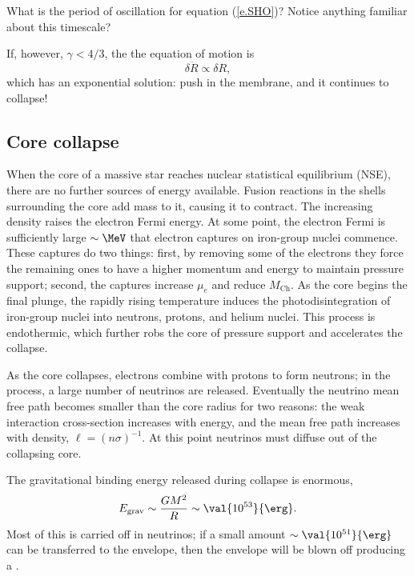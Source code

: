 \begin{exercisebox}
What is the period of oscillation for equation (\ref{e.SHO})?  Notice anything familiar about this timescale?
\end{exercisebox}

\noindent If, however, $\gamma < 4/3$, the the equation of motion is
\[ \delta\ddot{R} \propto \delta R, \]
which has an exponential solution: push in the membrane, and it continues to collapse!

\subsection{Core collapse}
When the core of a massive star reaches nuclear statistical equilibrium (NSE), there are no further sources of energy available. Fusion reactions in the shells surrounding the core add mass to it, causing it to contract.  The increasing density raises the electron Fermi energy.  At some point, the electron Fermi is sufficiently large $\sim\MeV$ that electron captures on iron-group nuclei commence.  These captures do two things: first, by removing some of the electrons they force the remaining ones to have a higher momentum and energy to maintain pressure support; second, the captures increase $\mu_{e}$ and reduce $M_{\mathrm{Ch}}$.  As the core begins the final plunge, the rapidly rising temperature induces the photodisintegration of iron-group nuclei into neutrons, protons, and helium nuclei.  This process is endothermic, which further robs the core of pressure support and accelerates the collapse.

As the core collapses, electrons combine with protons to form neutrons; in the process, a large number of neutrinos are released.  Eventually the neutrino mean free path becomes smaller than the core radius for two reasons: the weak interaction cross-section increases with energy, and the mean free path increases with density, $\ell = (n\sigma)^{-1}$.  At this point neutrinos must diffuse out of the collapsing core.

The gravitational binding energy released during collapse is enormous,
\[ E_{\mathrm{grav}} \sim \frac{GM^{2}}{R} \sim \val{10^{53}}{\erg}. \]
Most of this is carried off in neutrinos; if a small amount $\sim \val{10^{51}}{\erg}$ can be transferred to the envelope, then the envelope will be blown off producing a .

